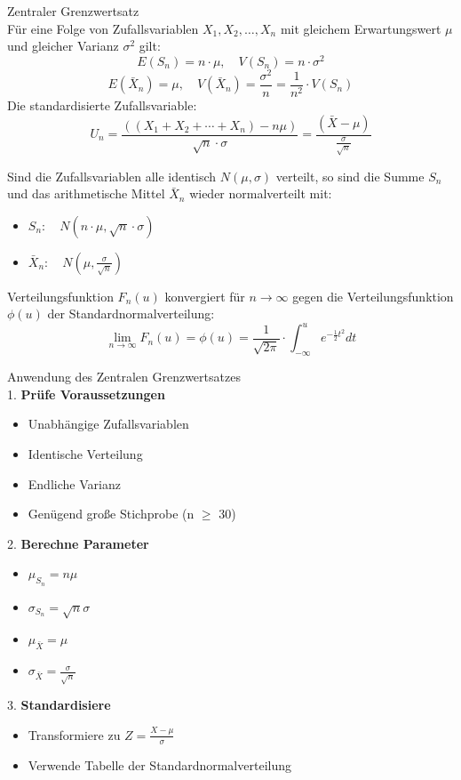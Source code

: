 \begin{theorem}{Zentraler Grenzwertsatz}\\
Für eine Folge von Zufallsvariablen $X_1, X_2, \ldots, X_n$ mit gleichem Erwartungswert $\mu$ und gleicher Varianz $\sigma^2$ gilt:
$$
E(S_n)=n \cdot \mu, \quad V(S_n)=n \cdot \sigma^2
$$
$$
E(\bar{X}_n)=\mu, \quad V(\bar{X}_n)=\frac{\sigma^2}{n}=\frac{1}{n^2} \cdot V(S_n)
$$
Die standardisierte Zufallsvariable:
$$
U_n=\frac{((X_1+X_2+\cdots+X_n)-n\mu)}{\sqrt{n} \cdot \sigma}=\frac{(\bar{X}-\mu)}{\frac{\sigma}{\sqrt{n}}}
$$

Sind die Zufallsvariablen alle identisch $N(\mu,\sigma)$ verteilt, so sind die Summe $S_n$ und das arithmetische Mittel $\bar{X}_n$ wieder normalverteilt mit:
\begin{itemize}
  \item $S_n: \quad N(n \cdot \mu, \sqrt{n} \cdot \sigma)$
  \item $\bar{X}_n: \quad N(\mu, \frac{\sigma}{\sqrt{n}})$
\end{itemize}
\vspace{3mm}
Verteilungsfunktion $F_n(u)$ konvergiert für $n \to \infty$ gegen die Verteilungsfunktion $\phi(u)$ der Standardnormalverteilung:
$$
\lim_{n\to\infty} F_n(u) = \phi(u) = \frac{1}{\sqrt{2\pi}} \cdot \int_{-\infty}^u e^{-\frac{1}{2}t^2} dt
$$
\end{theorem}



\begin{KR}{Anwendung des Zentralen Grenzwertsatzes}\\
1. \textbf{Prüfe Voraussetzungen}
   \begin{itemize}
   \item Unabhängige Zufallsvariablen
   \item Identische Verteilung
   \item Endliche Varianz
   \item Genügend große Stichprobe (n $\geq$ 30)
   \end{itemize}

2. \textbf{Berechne Parameter}
   \begin{itemize}
   \item $\mu_{S_n} = n\mu$
   \item $\sigma_{S_n} = \sqrt{n}\sigma$
   \item $\mu_{\bar{X}} = \mu$
   \item $\sigma_{\bar{X}} = \frac{\sigma}{\sqrt{n}}$
   \end{itemize}

3. \textbf{Standardisiere}
   \begin{itemize}
   \item Transformiere zu $Z = \frac{X-\mu}{\sigma}$
   \item Verwende Tabelle der Standardnormalverteilung
   \end{itemize}
\end{KR}

